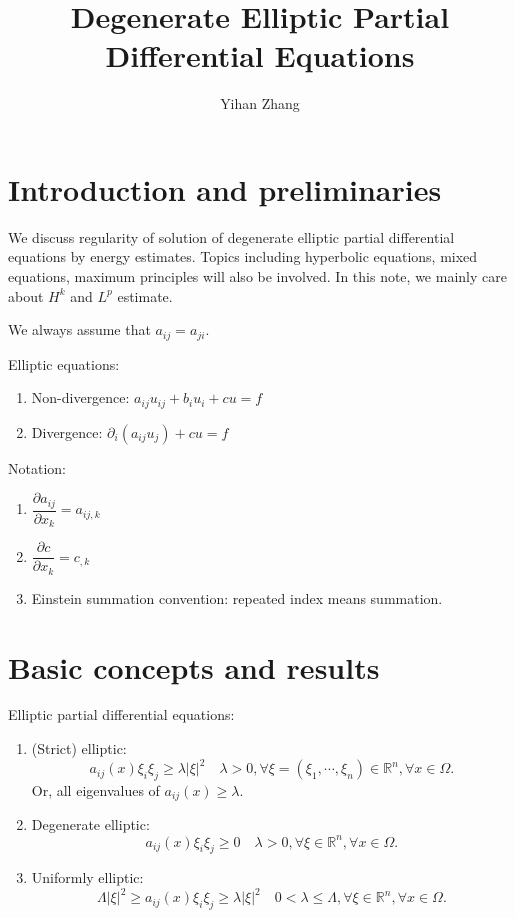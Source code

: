 \documentclass[12pt]{article}
\begin{document}
\bigskip
\bigskip

\title{Degenerate Elliptic Partial Differential Equations}
\author{Yihan Zhang}
\maketitle

\thispagestyle{empty}
\clearpage
\tableofcontents\thispagestyle{empty}

\newpage
\setcounter{page}{1}
\section{Introduction and preliminaries}
We discuss regularity of solution of degenerate elliptic partial differential equations by energy estimates. Topics including hyperbolic equations, mixed equations, maximum principles will also be involved. In this note, we mainly care about $H^k$ and $L^p$ estimate.

We always assume that $a_{ij}=a_{ji}$.

Elliptic equations:
\begin{enumerate}
	\item Non-divergence: $a_{ij}u_{ij}+b_iu_i+cu=f$
	\item Divergence: $\partial_i(a_{ij}u_j)+cu=f$
\end{enumerate}

Notation: 
\begin{enumerate}
\item $\dfrac{\partial a_{ij}}{\partial x_k}=a_{ij,k}$
\item $\dfrac{\partial c}{\partial x_k}=c_{,k}$
\item Einstein summation convention: repeated index means summation.
\end{enumerate}

\newpage
\section{Basic concepts and results}
Elliptic partial differential equations:
\begin{enumerate}
	\item (Strict) elliptic:
	\[a_{ij}(x)\xi_i\xi_j\ge\lambda|\xi|^2\quad\lambda>0, \forall\xi=(\xi_1,\cdots,\xi_n)\in\mathbb{R}^n, \forall x\in\Omega.\]
	Or, all eigenvalues of $a_{ij}(x)\ge\lambda$.
	\item Degenerate elliptic:
	\[a_{ij}(x)\xi_i\xi_j\ge0\quad\lambda>0, \forall\xi\in\mathbb{R}^n, \forall x\in\Omega.\]
	\item Uniformly elliptic:
	\[\Lambda|\xi|^2\ge a_{ij}(x)\xi_i\xi_j\ge\lambda|\xi|^2\quad0<\lambda\le\Lambda, \forall\xi\in\mathbb{R}^n, \forall x\in\Omega.\]
\end{enumerate}
\end{document}
